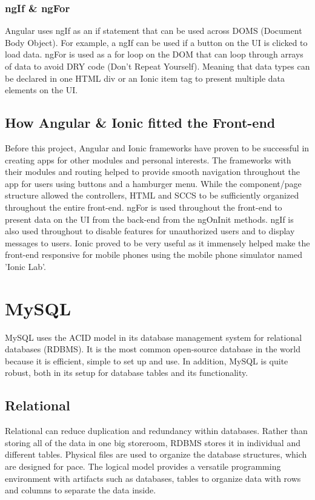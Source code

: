 \subsubsection{ngIf \& ngFor}
Angular uses ngIf as an if statement that can be used across DOMS (Document Body Object). For example, a ngIf can be used if a button on the UI is clicked to load data. ngFor is used as a for loop on the DOM that can loop through arrays of data to avoid DRY code (Don't Repeat Yourself). Meaning that data types can be declared in one HTML div or an Ionic item tag to present multiple data elements on the UI.

\subsection{How Angular \& Ionic fitted the Front-end}
Before this project, Angular and Ionic frameworks have proven to be successful in creating apps for other modules and personal interests. The frameworks with their modules and routing helped to provide smooth navigation throughout the app for users using buttons and a hamburger menu. While the component/page structure allowed the controllers, HTML and SCCS to be sufficiently organized throughout the entire front-end. ngFor is used throughout the front-end to present data on the UI from the back-end from the ngOnInit methods. ngIf is also used throughout to disable features for unauthorized users and to display messages to users.
Ionic proved to be very useful as it immensely helped make the front-end responsive for mobile phones using the mobile phone simulator named 'Ionic Lab'.

\section{MySQL}
MySQL uses the ACID model in its database management system for relational databases (RDBMS). It is the most common open-source database in the world because it is efficient, simple to set up and use. \cite{ref17}  In addition, MySQL is quite robust, both in its setup for database tables and its functionality.
 
\subsection{Relational}
Relational can reduce duplication and redundancy within databases. Rather than storing all of the data in one big storeroom, RDBMS stores it in individual and different tables. Physical files are used to organize the database structures, which are designed for pace. The logical model provides a versatile programming environment with artifacts such as databases, tables to organize data with rows and columns to separate the data inside. \cite{ref18}
 
